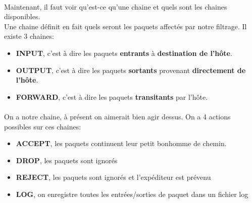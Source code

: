 \documentclass{article}
\begin{document}
\paragraph{}
Maintenant, il faut voir qu'est-ce qu'une chaine et quels sont les chaines disponibles.\\
Une chaine définit en fait quels seront les paquets affectés par notre filtrage. Il existe 3 chaines:
\begin{itemize}
\item{\textbf{INPUT}, c'est à dire les paquets \textbf{entrants} à \textbf{destination de l'hôte}.}
\item{\textbf{OUTPUT}, c'est à dire les paquets \textbf{sortants} provenant \textbf{directement de l'hôte}.}
\item{\textbf{FORWARD}, c'est à dire les paquets \textbf{transitants} par l'hôte.}
\end{itemize}


\paragraph{}
On a notre chaine, à présent on aimerait bien agir dessus. On a 4 actions possibles sur ces chaines:
\begin{itemize}
\item{\textbf{ACCEPT}, les paquets continuent leur petit bonhomme de chemin.}
\item{\textbf{DROP}, les paquets sont ignorés}
\item{\textbf{REJECT}, les paquets sont ignorés et l'expéditeur est prévenu}
\item{\textbf{LOG}, on enregistre toutes les entrées/sorties de paquet dans un fichier log}
\end{itemize}
\end{document}
